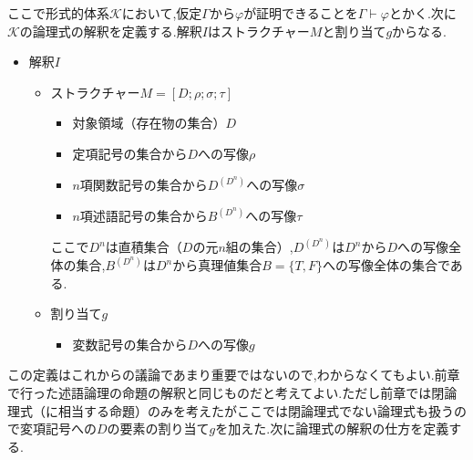 \documentclass[10pt,b5paper,papersize,dvipdfmx]{jsbook}
\begin{document}
ここで形式的体系$\mathcal K$において,仮定$\Gamma$から$\varphi$が証明できることを$\Gamma \vdash \varphi$とかく.次に$\mathcal K$の論理式の解釈を定義する.解釈$I$はストラクチャー$M$と割り当て$g$からなる.
\begin{itemize}
\item 解釈$I$
\begin{itemize}
\item ストラクチャー$M=[D;\rho;\sigma;\tau]$
\begin{itemize}
\item 対象領域（存在物の集合）$D$
\item 定項記号の集合から$D$への写像$\rho$
\item $n$項関数記号の集合から$D^{(D^n)}$への写像$\sigma$
\item $n$項述語記号の集合から$B^{(D^n)}$への写像$\tau$
\end{itemize}
ここで$D^n$は直積集合（$D$の元$n$組の集合）,$D^{(D^n)}$は$D^n$から$D$への写像全体の集合,$B^{(D^n)}$は$D^n$から真理値集合$B=\{T,F\}$への写像全体の集合である.
\item 割り当て$g$
\begin{itemize}
\item 変数記号の集合から$D$への写像$g$
\end{itemize}
\end{itemize}
\end{itemize}
この定義はこれからの議論であまり重要ではないので,わからなくてもよい.前章で行った述語論理の命題の解釈と同じものだと考えてよい.ただし前章では閉論理式（に相当する命題）のみを考えたがここでは閉論理式でない論理式も扱うので変項記号への$D$の要素の割り当て$g$を加えた.次に論理式の解釈の仕方を定義する.
\end{document}
